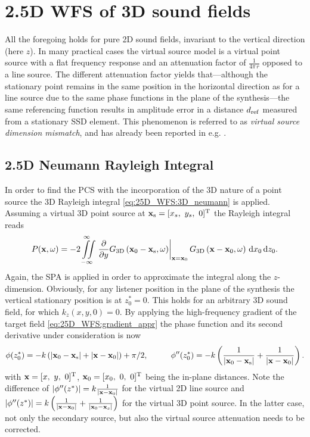 \section{2.5D WFS of 3D sound fields}

All the foregoing holds for pure 2D sound fields, invariant to the vertical direction (here $z$). 
In many practical cases the virtual source model is a virtual point source with a flat frequency response and an attenuation factor of $\frac{1}{4\pi\,r}$ opposed to a line source. 
The different attenuation factor yields that---although the stationary point remains in the same position in the horizontal direction as for a line source due to the same phase functions in the plane of the synthesis---the same referencing function results in amplitude error in a  distance $d_{\mathrm{ref}}$ measured from a stationary SSD element. 
This phenomenon is referred to as \emph{virtual source dimension mismatch}, and has already been reported in e.g. \cite{Voelk2012}.

\subsection{2.5D Neumann Rayleigh Integral}
In order to find the PCS with the incorporation of the 3D nature of a point source the 3D Rayleigh integral \eqref{eq:25D_WFS:3D_neumann} is applied. 
Assuming a virtual 3D point source at $\mathbf{x}_{\mathrm{s}} = [x_s,\ y_s,\ 0]^{\mathrm{T}}$  the Rayleigh integral reads
\begin{equation}
\label{Eq:Rayleigh3DPointSrc}
P(\mathbf{x},\omega) = -2 \iint\limits_{-\infty}^{\infty} \left. \frac{\partial}{\partial y} G_{3\text{D}}\left( \mathbf{x}_0-\mathbf{x}_{\mathrm{s}},\omega \right) \right|_{\mathbf{x} = \mathbf{x}_0} G_{3\text{D}}\left( \mathbf{x}-\mathbf{x}_0,\omega \right)\,\mathrm{d} x_0\,\mathrm{d} z_0.
\end{equation}
Again, the SPA is applied in order to approximate the integral along the $z$-dimension. Obviously, for any listener position in the plane of the synthesis the vertical stationary position is at $z_0^*=0$. This holds for an arbitrary 3D sound field, for which $k_z(x,y,0) = 0$. By applying the high-frequency gradient of the target field \eqref{eq:25D_WFS:gradient_appr} the phase function and its second derivative under consideration is now
\begin{equation}
\phi(z_0^*) = -k \left( |\vxo -\vxs| + |\vx - \vxo| \right) +\pi/2, \hspace{10mm} \phi''(z_0^*) = -k\left(   \frac{1}{| \vxo - \vxs|} + \frac{1}{ |\vx - \vxo |} \right).
\end{equation}
with $\vx = [x,\ y,\ 0]^{\mathrm{T}}$, $\vxo = [x_0,\ 0,\ 0]^{\mathrm{T}}$ being the in-plane distances. 
Note the difference of $|\phi''(z^*)| = k \frac{1}{ |\mathbf{x} - \mathbf{x}_0| }$ for the virtual 2D line source and $|\phi''(z^*)| = k \left( \frac{1}{| \mathbf{x} - \mathbf{x}_0|} + \frac{1}{ |\mathbf{x}_0 - \mathbf{x}_s |} \right)$ for the virtual 3D point source. 
In the latter case, not only the secondary source, but also the virtual source attenuation needs to be corrected.

